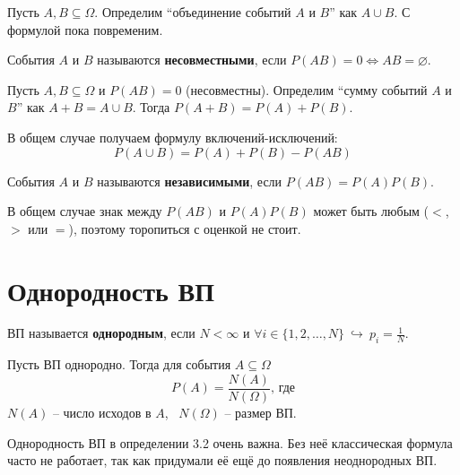 \documentclass[11pt]{article}
\begin{document}
\begin{definition}
  Пусть $A, B \subseteq \Omega$. Определим ``объединение 
  событий $A$ и $B$'' как $A \cup B$. С формулой пока 
  повременим.
\end{definition}

\begin{definition}
  События $A$ и $B$ называются \textbf{несовместными}, если 
  $P(AB) = 0 \Longleftrightarrow AB = \varnothing$.
\end{definition}

\begin{definition}
  Пусть $A, B \subseteq \Omega$ и $P(AB) = 0$ (несовместны). 
  Определим ``сумму событий $A$ и $B$'' как $A + B = A 
  \cup B$. Тогда $P(A + B) = P(A) + P(B)$.
\end{definition}

\begin{consequence}
  В общем случае получаем формулу включений-исключений:
  \[P(A \cup B) = P(A) + P(B) - P(AB)\]
\end{consequence}

\begin{definition}
  События $A$ и $B$ называются \textbf{независимыми}, если 
  $P(AB) = P(A)P(B)$.
\end{definition}

\begin{remark}
  В общем случае знак между $P(AB)$ и $P(A)P(B)$ может 
  быть любым ($<$, $>$ или $=$), поэтому торопиться с 
  оценкой не стоит.
\end{remark}

\section{Однородность ВП}

\begin{definition}
  ВП называется \textbf{однородным}, если $N < \infty 
  \text{ и } \forall i \in \{1, 2, \ldots, N\} \ \hookrightarrow \ 
  p_i = \displaystyle \frac{1}{N}$.
\end{definition}

\begin{definition}
  Пусть ВП однородно. Тогда для события $A \subseteq \Omega$ 
  \[P(A) = \frac{N(A)}{N(\Omega)} \text{, где}\]
  $N(A)$ -- число исходов в $A$, \ $N(\Omega)$ -- размер ВП.
\end{definition}

\begin{remark}
  Однородность ВП в определении 3.2 очень важна. Без неё 
  классическая формула часто не работает, так как придумали 
  её ещё до появления неоднородных ВП.
\end{remark}
\end{document}
